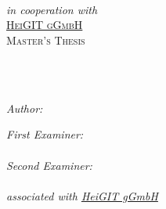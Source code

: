 \documentclass[
11pt, %
twoside, %
english, %
onehalfspacing, %
nolistspacing, %
liststotoc, %
parskip, %
headsepline, %
]{MastersDoctoralThesis} %
\author{Nikolaos \textsc{Kolaxidis}} %
\begin{document}
\frontmatter %

\pagestyle{plain} %


\begin{titlepage}
\begin{center}

{\color{hd-red} %
\textsc{\large 
    \univname\\[.4cm] %
    \deptname\\ %
    \facname
}}\\[.4cm] %
\emph{in cooperation with}\\[.4cm]
{\color{hd-red}
    \textsc{\href{https://heigit.org}{HeiGIT gGmbH}
}}\\[1.2cm]
\textsc{\LARGE Master's Thesis}\\[.8cm] %

\HRule \\ %
\vspace{.4cm}
\begin{adjustwidth}{-0.5em}{-0.5em}
    \centering
    {\huge \bfseries \ttitle \par} %
\end{adjustwidth}
\vspace{.4cm}
\HRule \\[1.2cm] %
 
\begin{minipage}[t]{.4\textwidth}
\begin{flushleft} \large
\emph{Author:}\\
{\color{hd-red}{\authorname}}
\end{flushleft}
\end{minipage}
\begin{minipage}[t]{.4\textwidth}
\begin{flushright} \large
\emph{First Examiner:} \\
{\color{hd-red}{\supname}} \\
\vspace{.4cm}
\emph{Second Examiner:}\\
{\color{hd-red}
    {\examname} \\
    \emph{associated with \href{https://heigit.org}{HeiGIT gGmbH}}
} \\


\end{flushright}
\end{minipage}
\end{center}
\end{titlepage}
\end{document}
